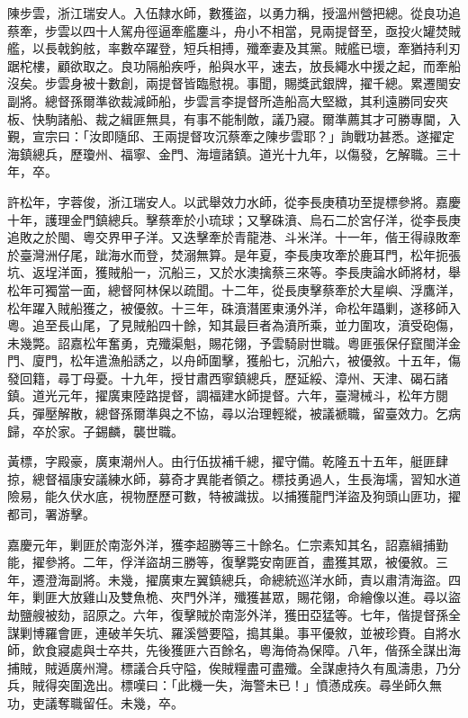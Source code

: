 \begin{pinyinscope}
陳步雲，浙江瑞安人。入伍隸水師，數獲盜，以勇力稱，授溫州營把總。從良功追蔡牽，步雲以四十人駕舟徑逼牽艦鏖斗，舟小不相當，見兩提督至，亟投火罐焚賊艦，以長戟鉤舷，率數卒躍登，短兵相搏，殲牽妻及其黨。賊艦已壞，牽猶持利刃踞柁樓，顧欲取之。良功隔船疾呼，船與水平，速去，放長繩水中援之起，而牽船沒矣。步雲身被十數創，兩提督皆臨慰視。事聞，賜獎武銀牌，擢千總。累遷閩安副將。總督孫爾準欲裁減師船，步雲言李提督所造船高大堅緻，其利遠勝同安夾板、快駒諸船、裁之緝匪無具，有事不能制敵，議乃寢。爾準薦其才可勝專閫，入覲，宣宗曰：「汝即隨邱、王兩提督攻沉蔡牽之陳步雲耶？」詢戰功甚悉。遂擢定海鎮總兵，歷瓊州、福寧、金門、海壇諸鎮。道光十九年，以傷發，乞解職。三十年，卒。

許松年，字蓉俊，浙江瑞安人。以武舉效力水師，從李長庚積功至提標參將。嘉慶十年，護理金門鎮總兵。擊蔡牽於小琉球；又擊硃濆、烏石二於宮仔洋，從李長庚追敗之於閩、粵交界甲子洋。又迭擊牽於青龍港、斗米洋。十一年，偕王得祿敗牽於臺灣洲仔尾，跐海水而登，焚溺無算。是年夏，李長庚攻牽於鹿耳門，松年扼張坑、返埕洋面，獲賊船一，沉船三，又於水澳擒蔡三來等。李長庚論水師將材，舉松年可獨當一面，總督阿林保以疏聞。十二年，從長庚擊蔡牽於大星嶼、浮鷹洋，松年躍入賊船獲之，被優敘。十三年，硃濆潛匿東湧外洋，命松年躡剿，遂移師入粵。追至長山尾，了見賊船四十餘，知其最巨者為濆所乘，並力圍攻，濆受砲傷，未幾斃。詔嘉松年奮勇，克殲渠魁，賜花翎，予雲騎尉世職。粵匪張保仔竄閩洋金門、廈門，松年遣漁船誘之，以舟師圍擊，獲船七，沉船六，被優敘。十五年，傷發回籍，尋丁母憂。十九年，授甘肅西寧鎮總兵，歷延綏、漳州、天津、碣石諸鎮。道光元年，擢廣東陸路提督，調福建水師提督。六年，臺灣械斗，松年方閱兵，彈壓解散，總督孫爾準與之不協，尋以治理輕縱，被議褫職，留臺效力。乞病歸，卒於家。子錫麟，襲世職。

黃標，字殿豪，廣東潮州人。由行伍拔補千總，擢守備。乾隆五十五年，艇匪肆掠，總督福康安議練水師，募奇才異能者領之。標技勇過人，生長海壖，習知水道險易，能久伏水底，視物歷歷可數，特被識拔。以捕獲龍門洋盜及狗頭山匪功，擢都司，署游擊。

嘉慶元年，剿匪於南澎外洋，獲李超勝等三十餘名。仁宗素知其名，詔嘉緝捕勤能，擢參將。二年，俘洋盜胡三勝等，復擊斃安南匪首，盡獲其眾，被優敘。三年，遷澄海副將。未幾，擢廣東左翼鎮總兵，命總統巡洋水師，責以肅清海盜。四年，剿匪大放雞山及雙魚桅、夾門外洋，殲獲甚眾，賜花翎，命繪像以進。尋以盜劫鹽艘被劾，詔原之。六年，復擊賊於南澎外洋，獲田亞猛等。七年，偕提督孫全謀剿博羅會匪，連破羊矢坑、羅溪營要隘，搗其巢。事平優敘，並被珍賚。自將水師，飲食寢處與士卒共，先後獲匪六百餘名，粵海倚為保障。八年，偕孫全謀出海捕賊，賊遁廣州灣。標議合兵守隘，俟賊糧盡可盡殲。全謀慮持久有風濤患，乃分兵，賊得突圍逸出。標嘆曰：「此機一失，海警未已！」憤懣成疾。尋坐師久無功，吏議奪職留任。未幾，卒。


\end{pinyinscope}
